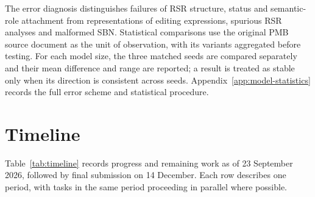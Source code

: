 \documentclass{article}
\begin{document}
The error diagnosis distinguishes failures of RSR structure, status and
semantic-role attachment from representations of editing expressions, spurious
RSR analyses and malformed SBN. Statistical comparisons use the original PMB
source document as the unit of observation, with its variants aggregated
before testing. For each model size, the three matched seeds are compared
separately and their mean difference and range are reported; a result is
treated as stable only when its direction is consistent across seeds.
Appendix~\ref{app:model-statistics} records the full error scheme and
statistical procedure.

\section{Timeline}
\label{sec:timeline}

Table~\ref{tab:timeline} records progress and remaining work as of 23 September
2026, followed by final submission on 14 December. Each row describes one
period, with tasks in the same period proceeding in parallel where possible.
\end{document}
